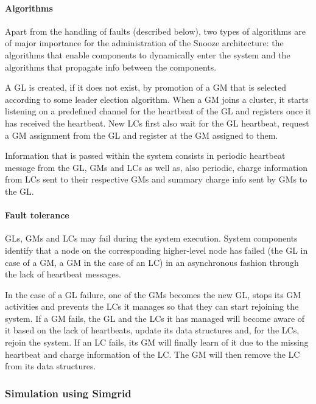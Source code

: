 \paragraph{Algorithms}
\label{sec:snoozeAlgs}

Apart from the handling of faults (described below), two types of
algorithms are of major importance for the administration of the
Snooze architecture: the algorithms that enable components to
dynamically enter the system and the algorithms that propagate info
between the components.

A GL is created, if it does not exist, by promotion of a GM that is
selected according to some leader election algorithm. When a GM joins
a cluster, it starts listening on a predefined channel for the
heartbeat of the GL and registers once it has received the
heartbeat. New LCs first also wait for the GL heartbeat, request a GM
assignment from the GL and register at the GM assigned to them.

Information that is passed within the system consists in periodic
heartbeat message from the GL, GMs and LCs as well as, also periodic,
charge information from LCs sent to their respective GMs and summary
charge info sent by GMs to the GL.


\paragraph{Fault tolerance}

GLs, GMs and LCs may fail during the system execution. System
components identify that a node on the corresponding higher-level node
has failed (the GL in case of a GM, a GM in the case of an LC) in an
asynchronous fashion through the lack of heartbeat messages.

In the case of a GL failure, one of the GMs becomes the new GL, stops
its GM activities and prevents the LCs it manages so that they can
start rejoining the system. If a GM fails, the GL and the LCs it has
managed will become aware of it based on the lack of heartbeats,
update its data structures and, for the LCs, rejoin the system. If an
LC fails, its GM will finally learn of it due to the missing heartbeat
and charge information of the LC. The GM will then remove the LC from
its data structures.

\subsubsection{Simulation using Simgrid}

